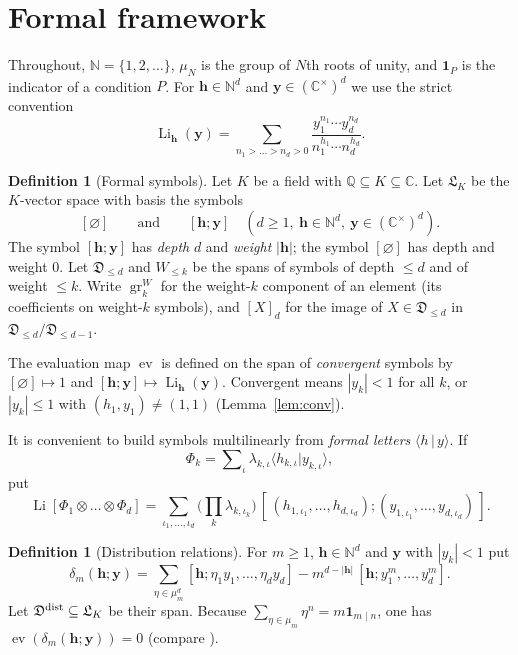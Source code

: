 \documentclass[11pt]{amsart}
\theoremstyle{definition}
\newtheorem{definition}[theorem]{Definition}
\theoremstyle{remark}
\numberwithin{equation}{section}
\newcommand{\N}{\mathbb{N}}
\newcommand{\Q}{\mathbb{Q}}
\newcommand{\C}{\mathbb{C}}
\newcommand{\Li}{\operatorname{Li}}
\newcommand{\ev}{\operatorname{ev}}
\newcommand{\fL}{\mathfrak{L}}
\newcommand{\fD}{\mathfrak{D}}
\newcommand{\gr}{\operatorname{gr}}
\newcommand{\one}{\mathbf{1}}
\newcommand{\hb}{\mathbf{h}}
\newcommand{\yb}{\mathbf{y}}
\begin{document}
\section{Formal framework}\label{sec:formal}

Throughout, $\N=\{1,2,\dots\}$, $\mu_N$ is the group of $N$th roots of unity, and $\one_P$ is the indicator of a condition $P$. For $\hb\in\N^d$ and $\yb\in(\C^\times)^d$ we use the strict convention
\begin{equation}\label{eq:Li}
\Li_\hb(\yb)=\sum_{n_1>\dots>n_d>0}\frac{y_1^{n_1}\cdots y_d^{n_d}}{n_1^{h_1}\cdots n_d^{h_d}} .
\end{equation}

\begin{definition}[Formal symbols]\label{def:formal}
Let $K$ be a field with $\Q\subseteq K\subseteq\C$. Let $\fL_K$ be the $K$-vector space with basis the symbols
\[
[\varnothing]\qquad\text{and}\qquad [\hb;\yb]\quad (d\ge1,\ \hb\in\N^d,\ \yb\in(\C^\times)^d).
\]
The symbol $[\hb;\yb]$ has \emph{depth} $d$ and \emph{weight} $|\hb|$; the symbol $[\varnothing]$ has depth and weight $0$. Let $\fD_{\le d}$ and $W_{\le k}$ be the spans of symbols of depth $\le d$ and of weight $\le k$. Write $\gr^W_k$ for the weight-$k$ component of an element (its coefficients on weight-$k$ symbols), and $[X]_d$ for the image of $X\in\fD_{\le d}$ in $\fD_{\le d}/\fD_{\le d-1}$.

The evaluation map $\ev$ is defined on the span of \emph{convergent} symbols by $[\varnothing]\mapsto1$ and $[\hb;\yb]\mapsto\Li_\hb(\yb)$. Convergent means $|y_k|<1$ for all $k$, or $|y_k|\le1$ with $(h_1,y_1)\ne(1,1)$ (Lemma~\ref{lem:conv}).
\end{definition}

It is convenient to build symbols multilinearly from \emph{formal letters} $\langle h\,|\,y\rangle$. If\[\Phi_k=\sum\nolimits_\iota\lambda_{k,\iota}\langle h_{k,\iota}|y_{k,\iota}\rangle,\]put
\[
\Li[\Phi_1\otimes\dots\otimes\Phi_d]=\sum_{\iota_1,\dots,\iota_d}\Big(\prod_k\lambda_{k,\iota_k}\Big)\,[\,(h_{1,\iota_1},\dots,h_{d,\iota_d});(y_{1,\iota_1},\dots,y_{d,\iota_d})\,].
\]

\begin{definition}[Distribution relations]\label{def:dist}
For $m\ge1$, $\hb\in\N^d$ and $\yb$ with $|y_k|<1$ put
\[
\delta_m(\hb;\yb)=\sum_{\eta\in\mu_m^d}[\hb;\eta_1y_1,\dots,\eta_dy_d]-m^{d-|\hb|}\,[\hb;y_1^m,\dots,y_d^m].
\]
Let $\fD^{\rm dist}\subseteq\fL_K$ be their span. Because $\sum_{\eta\in\mu_m}\eta^n=m\one_{m\mid n}$, one has $\ev(\delta_m(\hb;\yb))=0$ (compare \cite{Gon98,Rac02}).
\end{definition}
\end{document}
